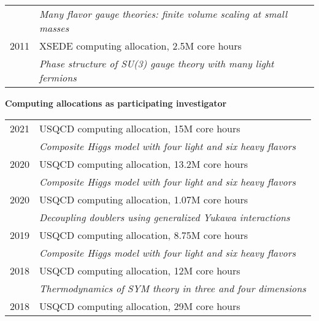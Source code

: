 \begin{spacelist}
\begin{tabular}[t]{cl}
           & \textit{Many flavor gauge theories: finite volume scaling at small masses}                               \\[6 pt]
      2011 & XSEDE computing allocation, 2.5M core hours                                                              \\ %
           & \textit{Phase structure of SU(3) gauge theory with many light fermions}                                  \\
    \end{tabular}

  \vspace{18 pt}
  \item {\large \bfseries Computing allocations as participating investigator} \\[10 pt]
    \begin{tabular}[t]{cl}
      2021 & USQCD computing allocation, 15M core hours                                                           \\ %
           & \textit{Composite Higgs model with four light and six heavy flavors}                                 \\[6 pt]
      2020 & USQCD computing allocation, 13.2M core hours                                                         \\ %
           & \textit{Composite Higgs model with four light and six heavy flavors}                                 \\[6 pt]
      2020 & USQCD computing allocation, 1.07M core hours                                                         \\ %
           & \textit{Decoupling doublers using generalized Yukawa interactions}                                   \\[6 pt]
      2019 & USQCD computing allocation, 8.75M core hours                                                         \\ %
           & \textit{Composite Higgs model with four light and six heavy flavors}                                 \\[6 pt]
      2018 & USQCD computing allocation, 12M core hours                                                           \\ %
           & \textit{Thermodynamics of SYM theory in three and four dimensions}                                   \\[6 pt]
      2018 & USQCD computing allocation, 29M core hours                                                           \\ %

\end{tabular}
\end{spacelist}
